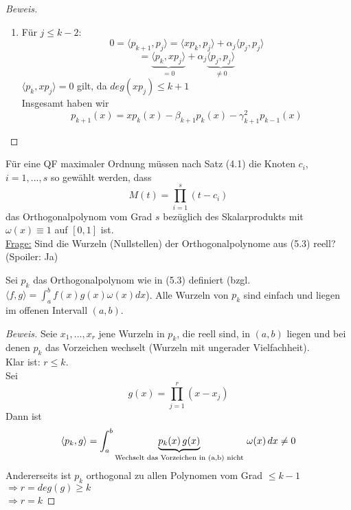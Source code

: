 \begin{theorem}
\begin{proof}[Beweis]
\begin{enumerate}
  \item Für $j \leq k-2$:
    $$ 0 = \langle p_{k+1}, p_{j} \rangle = \langle xp_{k}, p_{j} \rangle + \alpha_j \langle p_{j}, p_{j} \rangle$$
    $$ = \underbrace{\langle p_{k}, xp_{j} \rangle}_{= 0} + \alpha_j \underbrace{\langle p_{j}, p_{j} \rangle}_{\neq 0}$$
    $\langle p_{k}, xp_{j} \rangle = 0$ gilt, da $deg(xp_j) \leq k+1$ \\
    Insgesamt haben wir
    $$p_{k+1}(x) = xp_k(x) - \beta_{k+1}p_k(x) - \gamma_{k+1}^2 p_{k-1}(x)$$
\end{enumerate}
\end{proof}
\end{theorem}

\begin{comment*}
Für eine QF maximaler Ordnung müssen nach Satz (4.1) die Knoten $c_i$, $i=1, ...,s$ so gewählt werden, dass 
$$M(t) = \prod_{i=1}^s(t-c_i)$$
das Orthogonalpolynom vom Grad $s$ bezüglich des Skalarprodukts mit $\omega(x) \equiv 1$ auf $[0,1]$ ist. \\
    \underline{Frage:} Sind die Wurzeln (Nullstellen) der Orthogonalpolynome aus (5.3) reell? (Spoiler: Ja)
\end{comment*}

\begin{theorem}
Sei $p_k$ das Orthogonalpolynom wie in (5.3) definiert (bzgl. $\langle f, g \rangle = \int_a^b f(x)g(x)\omega(x)dx$). Alle Wurzeln von $p_k$ sind einfach und liegen im offenen Intervall $(a,b)$.

\begin{proof}[Beweis]
Seie $x_1, ..., x_r$ jene Wurzeln in $p_k$, die reell sind, in $(a, b)$ liegen und bei denen $p_k$ das Vorzeichen wechselt (Wurzeln mit ungerader Vielfachheit). \\
Klar ist: $r \leq k$. \\
Sei 
$$g(x) = \prod_{j=1}^r (x-x_j)$$ 
Dann ist 
$$ \langle p_k, g \rangle = \int_a^b \underbrace{p_k(x) \thinspace g(x)}_{\text{Wechselt das Vorzeichen in (a,b) nicht}} \thinspace \omega(x) \thinspace dx \neq 0$$
Andererseits ist $p_k$ orthogonal zu allen Polynomen vom Grad $\leq k-1$ \\
$\Rightarrow r = deg(g) \geq k$ \\
$\Rightarrow r=k$
\end{proof}
\end{theorem}

